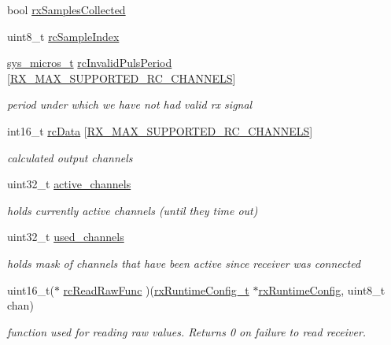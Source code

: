 \begin{DoxyCompactItemize}
bool \hyperlink{structrx_a5f44281e15335180cbe0cd7e4380e908}{rx\+Samples\+Collected}
\item 
uint8\+\_\+t \hyperlink{structrx_a6cd5094300fc7085b177a8c534ea8051}{rc\+Sample\+Index}
\item 
\hyperlink{system__calls_8h_a1374d627d8a03b6d9ebb6707c67cf2ff}{sys\+\_\+micros\+\_\+t} \hyperlink{structrx_a3456b8cddec1d82641efe4477915fdbc}{rc\+Invalid\+Puls\+Period} \mbox{[}\hyperlink{config_2rx_8h_a36c9eafe7932465eb9940ff115cacacb}{R\+X\+\_\+\+M\+A\+X\+\_\+\+S\+U\+P\+P\+O\+R\+T\+E\+D\+\_\+\+R\+C\+\_\+\+C\+H\+A\+N\+N\+E\+L\+S}\mbox{]}
\begin{DoxyCompactList}\small\item\em period under which we have not had valid rx signal \end{DoxyCompactList}\item 
int16\+\_\+t \hyperlink{structrx_a425ca7aa37d8d1c486f47104b4409e9a}{rc\+Data} \mbox{[}\hyperlink{config_2rx_8h_a36c9eafe7932465eb9940ff115cacacb}{R\+X\+\_\+\+M\+A\+X\+\_\+\+S\+U\+P\+P\+O\+R\+T\+E\+D\+\_\+\+R\+C\+\_\+\+C\+H\+A\+N\+N\+E\+L\+S}\mbox{]}
\begin{DoxyCompactList}\small\item\em calculated output channels \end{DoxyCompactList}\item 
uint32\+\_\+t \hyperlink{structrx_abfc8fd64f3a67de351da4d93de14aa59}{active\+\_\+channels}
\begin{DoxyCompactList}\small\item\em holds currently active channels (until they time out) \end{DoxyCompactList}\item 
uint32\+\_\+t \hyperlink{structrx_a335d0dacc6c5be5b735d9fbc568bab94}{used\+\_\+channels}
\begin{DoxyCompactList}\small\item\em holds mask of channels that have been active since receiver was connected \end{DoxyCompactList}\item 
uint16\+\_\+t($\ast$ \hyperlink{structrx_a6ce5eaf1289445a15528fb14da5494be}{rc\+Read\+Raw\+Func} )(\hyperlink{rx_2rx_8h_a42f050b55773f3d2df861b5860040fe8}{rx\+Runtime\+Config\+\_\+t} $\ast$\hyperlink{structrx_a72a978d821ed96dde83bf645e959baa3}{rx\+Runtime\+Config}, uint8\+\_\+t chan)
\begin{DoxyCompactList}\small\item\em function used for reading raw values. Returns 0 on failure to read receiver. \end{DoxyCompactList}\item 

\end{DoxyCompactItemize}
